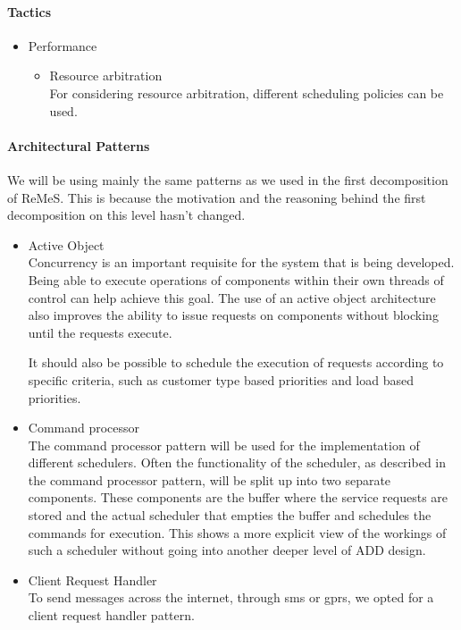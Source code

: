 \paragraph{Tactics}
\begin{itemize}
	\item Performance
	\begin{itemize}
		\item Resource arbitration\\
		For considering resource arbitration, different scheduling policies can be used.
	\end{itemize}
\end{itemize}


\paragraph{Architectural Patterns}
We will be using mainly the same patterns as we used in the first decomposition of ReMeS. 
This is because the motivation and the reasoning behind the first decomposition on this level
	hasn't changed.
\begin{itemize}
	\item Active Object \\
	Concurrency is an important requisite for the system that is being developed. Being able to execute operations of components within their own threads of control can help achieve this goal. The use of an active object architecture also improves the ability to issue requests on components without blocking until the requests execute.

It should also be possible to schedule the execution of requests according to specific criteria, such as customer type based priorities and load based priorities.

	\item Command processor \\
	The command processor pattern will be used for the implementation of different schedulers. Often the functionality of the scheduler, as described in the command processor pattern, will be split up into two separate components. 
These components are the buffer where the service requests are stored and the actual scheduler that empties the buffer and schedules the commands for execution. This shows a more explicit view of the workings of such a scheduler without going into another deeper level of ADD design.

	\item Client Request Handler \\
	To send messages across the internet, through sms or gprs, we opted for a
		client request handler pattern.	
\end{itemize}


